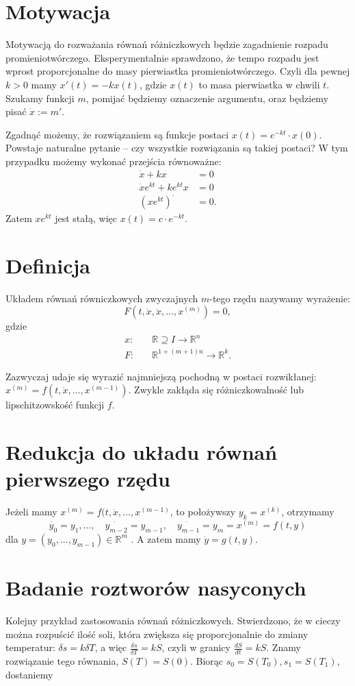 \section{Motywacja}


Motywacją do rozważania równań różniczkowych będzie zagadnienie rozpadu promieniotwórczego.
Eksperymentalnie sprawdzono, że tempo rozpadu jest wprost proporcjonalne do masy pierwiastka promieniotwórczego.
Czyli dla pewnej $k>0$ mamy $x'(t)=-kx(t)$, gdzie $x\left(t \right) $ to masa pierwiastka w chwili $t$.
Szukamy funkcji $m$, pomijać będziemy oznaczenie argumentu, oraz będziemy pisać $\dot{x}:=m'$. 

Zgadnąć możemy, że rozwiązaniem są funkcje postaci $x\left( t \right) = e^{-kt}\cdot x\left( 0 \right) $. Powstaje naturalne pytanie -- czy wszystkie rozwiązania są takiej postaci? W tym przypadku możemy wykonać przejścia równoważne:
\begin{align*}
	\dot{x}+kx&=0\\
	\dot{x}e^{kt}+ke^{kt}x&=0\\
	\left( xe^{kt} \right) ^{\cdot }&=0 
.\end{align*} Zatem $xe^{kt}$ jest stałą, więc $x\left( t \right) =c\cdot e^{-kt}$. 

\section{Definicja}
Układem równań równiczkowych zwyczajnych $m$-tego rzędu nazywamy wyrażenie: \[
	F\left(t,\dot{x},\ddot{x},\ldots,x^{(m)}\right)=0 
,\] gdzie 
\begin{align*}
	x: & \quad\mathbb{R}\supseteq I \to \mathbb{R}^{n}\\
	F:&  \quad\mathbb{R}^{1+\left( m+1 \right) n} \to \mathbb{R}^{k}
.\end{align*}

Zazwyczaj udaje się wyrazić najmniejszą pochodną w postaci rozwikłanej: $x^{\left( m \right) }=f\left( t, \dot{x}, \ldots, x^{\left( m-1 \right) } \right) $. Zwykle zakłąda się różniczkowalność lub lipschitzowskość funkcji $f$. 

\section{Redukcja do układu równań pierwszego rzędu}

Jeżeli mamy $x^{\left( m \right) }=f(t,\dot{x},\ldots,x^{\left( m-1 \right) }$, to położywszy $y_{k}=x^{(k)}$, otrzymamy $$\dot{y_{0}} = y_1, \ldots, \quad \dot{y_{m-2}}=y_{m-1}, \quad \dot{y_{m-1}}=y_m=x^{\left( m \right) }=f\left( t,y \right) $$ dla $y=\left( y_0,...,y_{m-1} \right) \in \mathbb{R}^{m}$ . 
A zatem mamy $\dot{y} = g\left( t,y \right) $.
\section{Badanie roztworów nasyconych}
Kolejny przykład zastosowania równań różniczkowych. Stwierdzono, że w cieczy można rozpuścić ilość soli, która zwiększa się proporcjonalnie do zmiany temperatur: $\delta s=k\delta T$, a więc $\frac{\delta s}{\delta T}=kS$, czyli w granicy $\frac{dS}{dt}=kS$. Znamy rozwiązanie tego równania, $S\left( T \right) =S\left( 0 \right) $. Biorąc $s_0=S(T_0), s_1=S(T_1)$, dostaniemy  
